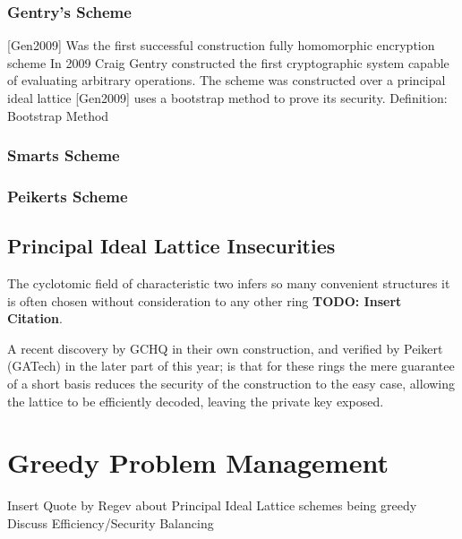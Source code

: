 \subsubsection{Gentry's Scheme}
[Gen2009] Was the first successful construction fully homomorphic encryption scheme In 2009 Craig Gentry constructed the first cryptographic system capable of evaluating arbitrary operations. The scheme was constructed over a principal ideal lattice [Gen2009] uses a bootstrap method to prove its security.
Definition: Bootstrap Method 

\subsubsection{Smarts Scheme}

\subsubsection{Peikerts Scheme}

\subsection{Principal Ideal Lattice Insecurities}

The cyclotomic field of characteristic two infers so many convenient
structures it is often chosen without consideration to any other ring \textbf{TODO: Insert Citation}.

A recent discovery by GCHQ in their own construction, and verified by Peikert
(GATech) in the later part of this year; is that for these rings the
mere guarantee of a short basis reduces the security of the
construction to the easy case, allowing the lattice to be efficiently
decoded, leaving the private key exposed.

\section{Greedy Problem Management}

Insert Quote by Regev about Principal Ideal Lattice schemes being greedy 
Discuss Efficiency/Security Balancing

